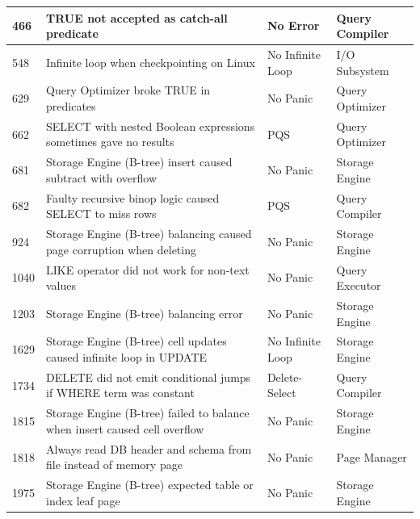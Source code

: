 \begin{singlespace}
\begin{footnotesize}
\begin{table}[h!]
{\begin{tabular}{ | p{} | p{} | p{} | p{} |}
          466          & TRUE not accepted as catch-all predicate                                   & No Error         & Query Compiler  \\
          \hline
          548          & Infinite loop when checkpointing on Linux                                  & No Infinite Loop & I/O Subsystem   \\
          \hline
          629          & Query Optimizer broke TRUE in predicates                                   & No Panic         & Query Optimizer \\
          \hline
          662          & SELECT with nested Boolean expressions sometimes gave no results           & PQS              & Query Optimizer \\
          \hline
          681          & Storage Engine (B-tree) insert caused subtract with overflow               & No Panic         & Storage Engine  \\
          \hline
          682          & Faulty recursive binop logic caused SELECT to miss rows                    & PQS              & Query Compiler  \\
          \hline
          924          & Storage Engine (B-tree) balancing caused page corruption when deleting     & No Panic         & Storage Engine  \\
          \hline
          1040         & LIKE operator did not work for non-text values                             & No Panic         & Query Executor  \\
          \hline
          1203         & Storage Engine (B-tree) balancing error                                    & No Panic         & Storage Engine  \\
          \hline
          1629         & Storage Engine (B-tree) cell updates caused infinite loop in UPDATE        & No Infinite Loop & Storage Engine  \\
          \hline
          1734         & DELETE did not emit conditional jumps if WHERE term was constant           & Delete-Select    & Query Compiler  \\
          \hline
          1815         & Storage Engine (B-tree) failed to balance when insert caused cell overflow & No Panic         & Storage Engine  \\
          \hline
          1818         & Always read DB header and schema from file instead of memory page          & No Panic         & Page Manager    \\
          \hline
          1975         & Storage Engine (B-tree) expected table or index leaf page                  & No Panic         & Storage Engine  \\

\end{tabular}}
\end{table}
\end{footnotesize}
\end{singlespace}
